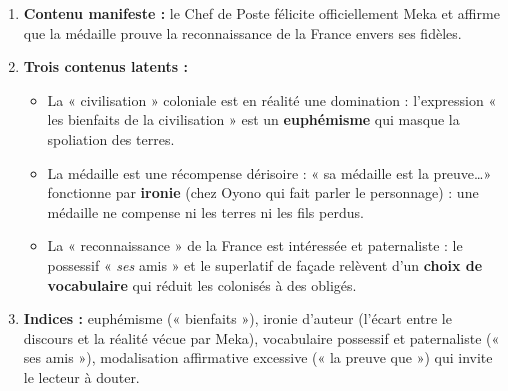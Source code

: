 \documentclass[11pt]{article}
\begin{document}
\begin{corrige}
\begin{enumerate}
\item \textbf{Contenu manifeste :} le Chef de Poste félicite officiellement Meka et affirme que la médaille prouve la reconnaissance de la France envers ses fidèles.
\item \textbf{Trois contenus latents :}
\begin{itemize}
\item La « civilisation » coloniale est en réalité une domination : l'expression « les bienfaits de la civilisation » est un \textbf{euphémisme} qui masque la spoliation des terres.
\item La médaille est une récompense dérisoire : « sa médaille est la preuve\ldots » fonctionne par \textbf{ironie} (chez Oyono qui fait parler le personnage) : une médaille ne compense ni les terres ni les fils perdus.
\item La « reconnaissance » de la France est intéressée et paternaliste : le possessif « \emph{ses} amis » et le superlatif de façade relèvent d'un \textbf{choix de vocabulaire} qui réduit les colonisés à des obligés.
\end{itemize}
\item \textbf{Indices :} euphémisme (« bienfaits »), ironie d'auteur (l'écart entre le discours et la réalité vécue par Meka), vocabulaire possessif et paternaliste (« ses amis »), modalisation affirmative excessive (« la preuve que ») qui invite le lecteur à douter.
\end{enumerate}
\end{corrige}
\end{document}
